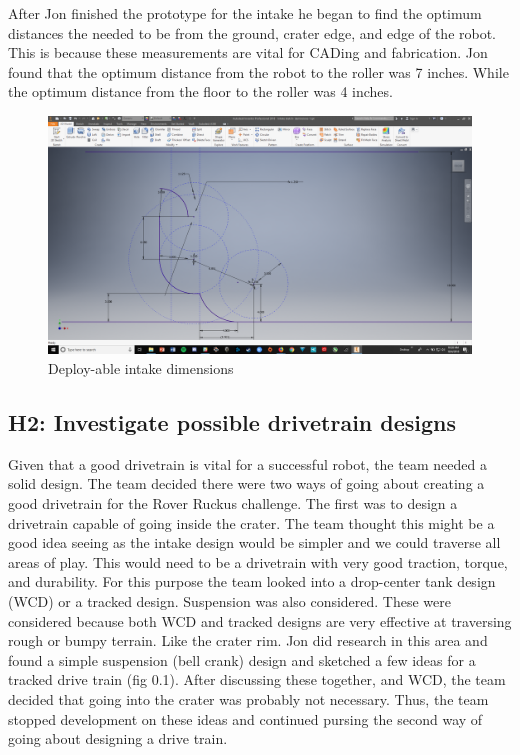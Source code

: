 \documentclass{article}
\begin{document}
After Jon finished the prototype for the intake he began to find the optimum distances the needed to be from the ground, crater edge, and edge of the robot. This is because these measurements are vital for CADing and fabrication. Jon found that the optimum distance from the robot to the roller was 7 inches. While the optimum distance from the floor to the roller was 4 inches. 
\begin{figure}
    \centering
    \includegraphics[width=.6\textwidth]{02_09-10/images/intakesketch.png}
    \caption{Deploy-able intake dimensions}
    \label{fig:intake}
\end{figure}



\subsection{H2: Investigate possible drivetrain designs}

Given that a good drivetrain is vital for a successful robot, the team needed a solid design. The team decided there were two ways of going about creating a good drivetrain for the Rover Ruckus challenge. The first was to design a drivetrain capable of going inside the crater. The team thought this might be a good idea seeing as the intake design would be simpler and we could traverse all areas of play. This would need to be a drivetrain with very good traction, torque, and durability. For this purpose the team looked into a drop-center tank design (WCD) or a tracked design. Suspension was also considered. These were considered because both WCD and tracked designs are very effective at traversing rough or bumpy terrain. Like the crater rim. Jon did research in this area and found a simple suspension (bell crank) design and sketched a few ideas for a tracked drive train (fig 0.1). After discussing these together, and WCD, the team decided that going into the crater was probably not necessary. Thus, the team stopped development on these ideas and continued pursing the second way of going about designing a drive train.
\end{document}
